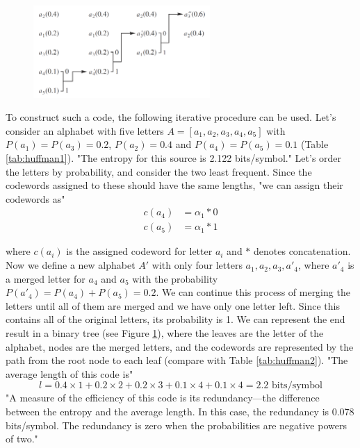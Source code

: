       \begin{figure}
        \centering
        \includegraphics[width=0.6\textwidth]{huffman}
        \label{fig:huffman}
      \end{figure}

      To construct such a code, the following iterative procedure can be used. Let's consider an alphabet with five letters $A = [a_1,a_2,a_3,a_4,a_5]$ with $P(a_1)=P(a_3)=0.2$, $P(a_2)=0.4$ and $P(a_4)=P(a_5)=0.1$ (Table \ref{tab:huffman1}). "The entropy for this source is 2.122 bits/symbol." Let's order the letters by probability, and consider the two least frequent. Since the codewords assigned to these should have the same lengths, "we can assign their codewords as"
      \begin{align*}
        c(a_4) &= \alpha_1 * 0 \\
        c(a_5) &= \alpha_1 *1
      \end{align*}

      where $c(a_i)$ is the assigned codeword for letter $a_i$ and $*$ denotes concatenation. Now we define a new alphabet $A'$ with only four letters $a_1, a_2, a_3, a'_4$, where $a'_4$ is a merged letter for $a_4$ and $a_5$ with the probability $P(a'_4) = P(a_4) + P(a_5) = 0.2$. We can continue this process of merging the letters until all of them are merged and we have only one letter left. Since this contains all of the original letters, its probability is 1. We can represent the end result in a binary tree (see Figure \ref{fig:huffman}), where the leaves are the letter of the alphabet, nodes are the merged letters, and the codewords are represented by the path from the root node to each leaf (compare with Table \ref{tab:huffman2}). "The average length of this code is"
      \begin{equation}
        l = 0.4\times 1 + 0.2 \times 2 + 0.2 \times 3 + 0.1 \times 4 + 0.1 \times 4 = 2.2 \text{ bits/symbol}
      \end{equation}
      "A measure of the efficiency of this code is its redundancy—the difference between the entropy and the average length. In this case, the redundancy is 0.078 bits/symbol. The redundancy is zero when the probabilities are negative powers of two."

